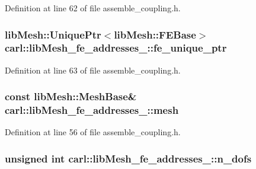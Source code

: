 Definition at line 62 of file assemble\+\_\+coupling.\+h.

\hypertarget{classcarl_1_1lib_mesh__fe__addresses__3_ae1c6278181a94410966bf313f2ecabe2}{}
\subsubsection[{fe\+\_\+unique\+\_\+ptr}]{\setlength{\rightskip}{0pt plus 5cm}lib\+Mesh\+::\+Unique\+Ptr$<$lib\+Mesh\+::\+F\+E\+Base$>$ carl\+::lib\+Mesh\+\_\+fe\+\_\+addresses\+\_\+::fe\+\_\+unique\+\_\+ptr}\label{classcarl_1_1lib_mesh__fe__addresses__3_ae1c6278181a94410966bf313f2ecabe2}


Definition at line 63 of file assemble\+\_\+coupling.\+h.

\hypertarget{classcarl_1_1lib_mesh__fe__addresses__3_a4b98976e0abb51da524d0750bfcaa313}{}
\subsubsection[{mesh}]{\setlength{\rightskip}{0pt plus 5cm}const lib\+Mesh\+::\+Mesh\+Base\& carl\+::lib\+Mesh\+\_\+fe\+\_\+addresses\+\_\+::mesh}\label{classcarl_1_1lib_mesh__fe__addresses__3_a4b98976e0abb51da524d0750bfcaa313}


Definition at line 56 of file assemble\+\_\+coupling.\+h.

\hypertarget{classcarl_1_1lib_mesh__fe__addresses__3_a58f0a44b9a123347f35281cbc58e7206}{}
\subsubsection[{n\+\_\+dofs}]{\setlength{\rightskip}{0pt plus 5cm}unsigned int carl\+::lib\+Mesh\+\_\+fe\+\_\+addresses\+\_\+::n\+\_\+dofs}\label{classcarl_1_1lib_mesh__fe__addresses__3_a58f0a44b9a123347f35281cbc58e7206}


